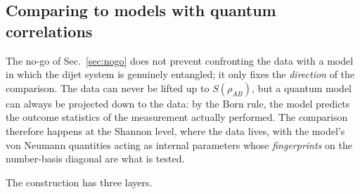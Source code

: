 \documentclass[11pt]{article}
\begin{document}
\subsection{Comparing to models with quantum correlations}
\label{sec:qmodel}

The no-go of Sec.~\ref{sec:nogo} does not prevent confronting the data
with a model in which the dijet system is genuinely entangled; it only
fixes the \emph{direction} of the comparison. The data can never be
lifted up to $S(\rho_{AB})$, but a quantum model can always be projected
down to the data: by the Born rule, the model predicts the outcome
statistics of the measurement actually performed. The comparison
therefore happens at the Shannon level, where the data lives, with the
model's von Neumann quantities acting as internal parameters whose
\emph{fingerprints} on the number-basis diagonal are what is tested.

The construction has three layers.
\end{document}
